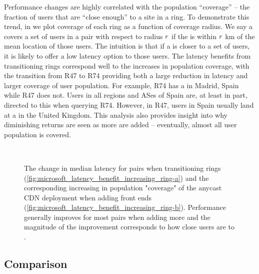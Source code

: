 \documentclass[sigconf,letterpaper,nonacm,10pt,anonymous]{acmart}
\begin{document}
Performance changes are highly correlated with the population
``coverage'' -- the fraction of users that are ``close enough'' to a
site in a ring. To demonstrate this trend, in
 we plot coverage
of each ring as a function of coverage radius. We say a \fe covers a set
of users in a \metroas pair with respect to radius \(\mathnormal{r}\) if
the \fe is within \(\mathnormal{r}\) km of the mean location of those
users. The intuition is that if a \fe is closer to a set of users, it is
likely to offer a low latency option to those users. The latency
benefits from transitioning rings correspond well to the increases in
population coverage, with the transition from R47 to R74 providing both
a large reduction in latency and larger coverage of user population. For
example, R74 has a \fe in Madrid, Spain while R47 does not. Users in all
regions and ASes of Spain are, at least in part, directed to this
\fe when querying R74. However, in R47, users in Spain usually land at a
\fe in the United Kingdom. This analysis also provides insight into why
diminishing returns are seen as more \feplural are added -- eventually,
almost all user population is covered.

\begin{figure}[]
    \centering
     \\
     \caption{The change in median latency for \metroas pairs when transitioning rings (\ref{fig:microsoft_latency_benefit_increasing_ring-a}) and the corresponding increasing in population "coverage" of the anycast CDN deployment when adding front ends (\ref{fig:microsoft_latency_benefit_increasing_ring-b}). Performance generally improves for most \metroas pairs when adding more \feplural and the magnitude of the improvement corresponds to how close users are to \feplural.}
     \label{fig:microsoft_latency_benefit_increasing_ring}
\end{figure}

\subsection{Comparison}\label{comparison-2}
\end{document}
